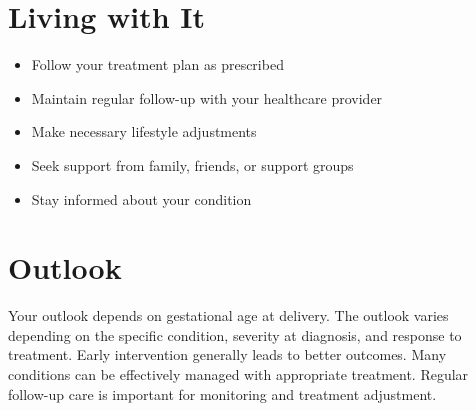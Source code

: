 \section{Living with It}
\begin{itemize}[noitemsep]
  \item Follow your treatment plan as prescribed
  \item Maintain regular follow-up with your healthcare provider
  \item Make necessary lifestyle adjustments
  \item Seek support from family, friends, or support groups
  \item Stay informed about your condition
\end{itemize}
\section{Outlook}
Your outlook depends on gestational age at delivery. The outlook varies depending on the specific condition, severity at diagnosis, and response to treatment. Early intervention generally leads to better outcomes. Many conditions can be effectively managed with appropriate treatment. Regular follow-up care is important for monitoring and treatment adjustment.
